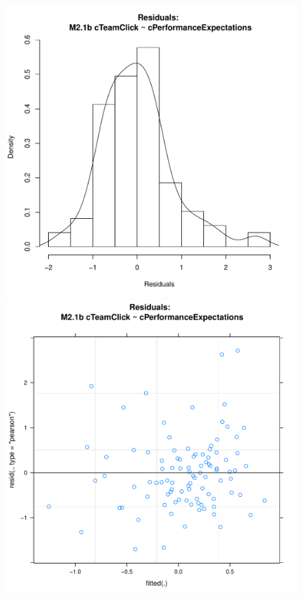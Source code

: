 \documentclass[12pt]{report}
\begin{document}
{\begin{figure}[htbp]
  \includegraphics[scale =.4]{../images/MLM21bHist.pdf}
  \includegraphics[scale =.4]{../images/MLM21bScatter.pdf}

\end{figure}}
\end{document}

